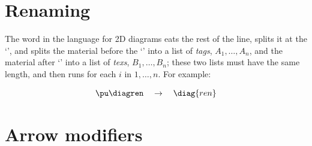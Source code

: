 \documentclass[oneside]{article}
\begin{document}
\section{Renaming}

The word  in the language for 2D diagrams eats the rest of the
line, splits it at the `\co{==>}', and splits the material before the
`\co{==>}' into a list of {\sl tags}, $A_1, \ldots, A_n$, and the
material after `\co{==>}' into a list of {\sl texs}, $B_1, \ldots,
B_n$; these two lists must have the same length, and then 
runs  for each $i$ in $1,\ldots,n$. For
example:


$$\pu
  \myvcenter{\diagren}
  \quad
  \to
  \quad
  \diag{ren}
$$



%                                
\section{Arrow modifiers}

\end{document}
